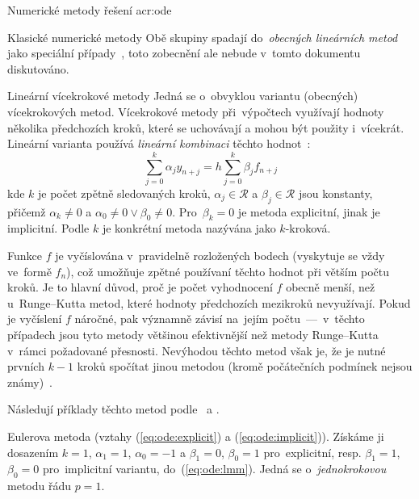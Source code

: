 \documentclass[thesis=M,czech]{FITthesis}[2012/06/26]
\newcommand{\acrlabel}[1]{acr:#1}
\newcommand{\acr}[1]{\acrshort{\acrlabel{#1}}}
\newcommand{\hl}[1]{\textit{#1}}
\newcommand{\name}[1]{\hl{#1}}
\newcommand{\cit}[1]{\cite{#1}}
\newcommand{\rf}[1]{\ref{#1}}
\newcommand{\rfeq}[1]{(\rf{eq:#1})}
\newcommand{\set}[1]{\ensuremath{\mathcal{#1}}}
\begin{document}
\begin{section}{Numerické metody řešení \acr{ode}}
\begin{subsection}{Klasické numerické metody}
Obě skupiny spadají do~\name{obecných lineárních metod}
jako speciální případy~\cit{ode-nsolve-intro},
toto zobecnění ale nebude v~tomto dokumentu diskutováno.


\begin{subsubsection}{Lineární vícekrokové metody}
\label{sss:search:ode:classic:lmm}
Jedná se o~obvyklou variantu (obecných) vícekrokových metod.
Vícekrokové metody při~výpočtech využívají hodnoty několika předchozích kroků,
které se uchovávají a mohou být použity i~vícekrát.
Lineární varianta používá \hl{lineární kombinaci}
těchto hodnot~\cit{ode-nsolve-lec}:
\begin{equation}\label{eq:ode:lmm}
   \sum_{j=0}^{k} \alpha_{j} y_{n+j} =
      h \sum_{j=0}^{k} \beta_{j} f_{n+j}
\end{equation}
kde $k$ je počet zpětně sledovaných kroků,
${\alpha_{j} \in \set{R}}$ a ${\beta_{j} \in \set{R}}$ jsou konstanty,
přičemž ${\alpha_{k} \neq 0}$ a ${\alpha_{0} \neq 0 \lor \beta_{0} \neq 0}$.
Pro~${\beta_k = 0}$ je metoda explicitní, jinak je implicitní.
Podle $k$ je konkrétní metoda nazývána jako $k$-kroková.

Funkce $f$ je vyčíslována v~pravidelně rozložených bodech
(vyskytuje se vždy ve~formě $f_n$),
což umožňuje zpětné používaní těchto hodnot
při větším počtu kroků.
Je to hlavní důvod,
proč je počet vyhodnocení $f$
obecně menší, než u~Runge--Kutta metod,
které hodnoty předchozích mezikroků nevyužívají.
Pokud je vyčíslení $f$ náročné,
pak významně závisí na~jejím počtu~---~v~těchto případech
jsou tyto metody
většinou efektivnější než metody Runge--Kutta
v~rámci požadované přesnosti.
Nevýhodou těchto metod však je,
že je nutné prvních ${k-1}$ kroků spočítat jinou metodou
(kromě počátečních podmínek nejsou známy)~\cit{ode-nsolve-book}.

Následují příklady těchto metod
podle~\cit{ode-nsolve-lec} a \cit{ode-nsolve-book}.


\begin{paragraph}{Eulerova metoda}\label{p:search:ode:classic:lmm:euler}
(vztahy \rfeq{ode:explicit} a \rfeq{ode:implicit}).
Získáme ji dosazením ${k = 1}$, ${\alpha_{1} = 1}$, ${\alpha_{0} = -1}$
a ${\beta_{1} = 0}$, ${\beta_{0} = 1}$ pro~explicitní,
resp. ${\beta_{1} = 1}$, ${\beta_{0} = 0}$ pro~implicitní variantu,
do~\rfeq{ode:lmm}.
Jedná se o~\hl{jednokrokovou} metodu řádu ${p = 1}$.
\end{paragraph} %


\end{subsubsection}
\end{subsection}
\end{section}
\end{document}
